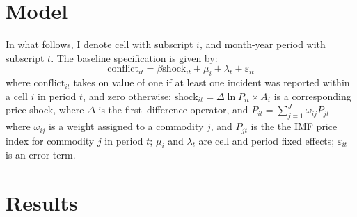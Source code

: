 \documentclass[11pt]{article}
\begin{document}
\section{Model}

In what follows, I denote cell with subscript $i$, and month-year period with subscript $t$. The baseline specification is given by:
\begin{equation}
\text{conflict}_{it} = \beta \text{shock}_{it} + \mu_i + \lambda_{t} + \varepsilon_{it}
\end{equation}
where $\text{conflict}_{it}$ takes on value of one if at least one incident was reported within a cell $i$ in period $t$, and zero otherwise; $\text{shock}_{it}=\Delta \ln P_{it}\times A_i$ is a corresponding price shock, where $\Delta$ is the first--difference operator, and $P_{it} = \sum_{j=1}^{J} \omega_{ij} P_{jt}$ where $\omega_{ij}$ is a weight assigned to a commodity $j$, and $P_{jt}$ is the the IMF price index for commodity $j$ in period $t$; $\mu_i$ and $\lambda_{t}$ are cell and period fixed effects; $\varepsilon_{it}$ is an error term. 

\section{Results}
\end{document}
